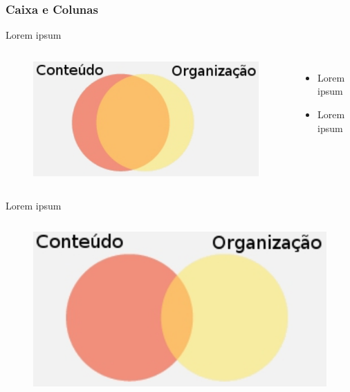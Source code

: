 \documentclass[11pt, red]{beamer}
\begin{document}
\begin{frame} \frametitle{Caixa e Colunas}

\begin{beamerboxesrounded}[upper=fundovermelho,lower=fundocinza,shadow=true]{Lorem ipsum}
   
\begin{columns}

\scriptsize


\begin{figure}[htb]\label{getcomp}
    \begin{center}
        \includegraphics[width=0.7\linewidth]{Figuras/WYSIWYG.png}
    \end{center}
\end{figure}
 

    \begin{itemize}
    \item Lorem ipsum
    \item Lorem ipsum
    \end{itemize}
    
\end{columns}
     
\end{beamerboxesrounded}

\vfill

\begin{beamerboxesrounded}[upper=fundovermelho,lower=fundocinza,shadow=true]{Lorem ipsum}
   
\begin{columns}
\scriptsize
{}
\begin{figure}[htb]\label{wysiwym}
    \begin{center}
        \includegraphics[width=0.7\linewidth]{Figuras/WYSIWYM.png}
    \end{center}
\end{figure}
 

\end{columns}
\end{beamerboxesrounded}
\end{frame}
\end{document}
